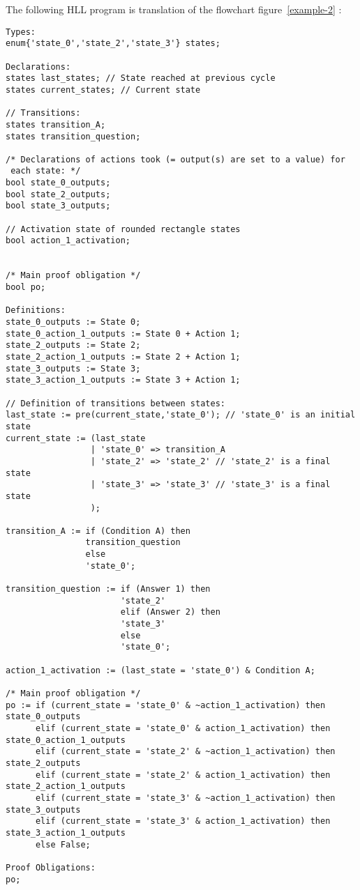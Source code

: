 The following HLL program is translation of the flowchart
figure~\ref{example-2} : 
{\footnotesize
\begin{verbatim}
Types:
enum{'state_0','state_2','state_3'} states;

Declarations:
states last_states; // State reached at previous cycle
states current_states; // Current state

// Transitions:
states transition_A;
states transition_question;

/* Declarations of actions took (= output(s) are set to a value) for
 each state: */
bool state_0_outputs;
bool state_2_outputs;
bool state_3_outputs;

// Activation state of rounded rectangle states
bool action_1_activation;


/* Main proof obligation */
bool po;

Definitions:
state_0_outputs := State 0;
state_0_action_1_outputs := State 0 + Action 1;
state_2_outputs := State 2;
state_2_action_1_outputs := State 2 + Action 1;
state_3_outputs := State 3;
state_3_action_1_outputs := State 3 + Action 1;

// Definition of transitions between states:
last_state := pre(current_state,'state_0'); // 'state_0' is an initial state
current_state := (last_state
                 | 'state_0' => transition_A
                 | 'state_2' => 'state_2' // 'state_2' is a final state
                 | 'state_3' => 'state_3' // 'state_3' is a final state
                 );

transition_A := if (Condition A) then
                transition_question
                else
                'state_0';

transition_question := if (Answer 1) then
                       'state_2'
                       elif (Answer 2) then
                       'state_3'
                       else
                       'state_0';

action_1_activation := (last_state = 'state_0') & Condition A;

/* Main proof obligation */
po := if (current_state = 'state_0' & ~action_1_activation) then state_0_outputs
      elif (current_state = 'state_0' & action_1_activation) then state_0_action_1_outputs
      elif (current_state = 'state_2' & ~action_1_activation) then state_2_outputs
      elif (current_state = 'state_2' & action_1_activation) then state_2_action_1_outputs
      elif (current_state = 'state_3' & ~action_1_activation) then state_3_outputs
      elif (current_state = 'state_3' & action_1_activation) then state_3_action_1_outputs
      else False;

Proof Obligations:
po;
\end{verbatim}
}


